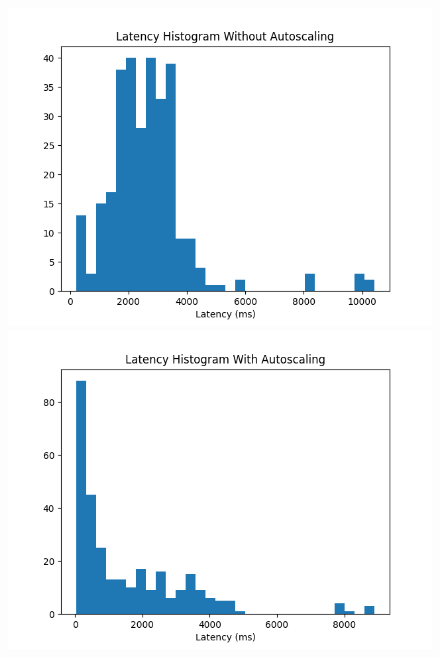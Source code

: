 \documentclass{article}
\begin{document}
\begin{itemize}
    \begin{figure}[H]
        \centering
        \begin{minipage}{0.45\textwidth}
            \centering
            \includegraphics[width=\linewidth]{../plots/latency_without_autoscaling_hist.png}
        \end{minipage}\hfill
        \begin{minipage}{0.45\textwidth}
            \centering
            \includegraphics[width=\linewidth]{../plots/latency_with_autoscaling_hist.png}
        \end{minipage}
        \vspace{0.5cm}
        \begin{minipage}{0.45\textwidth}

\end{minipage}
\end{figure}
\end{itemize}
\end{document}
